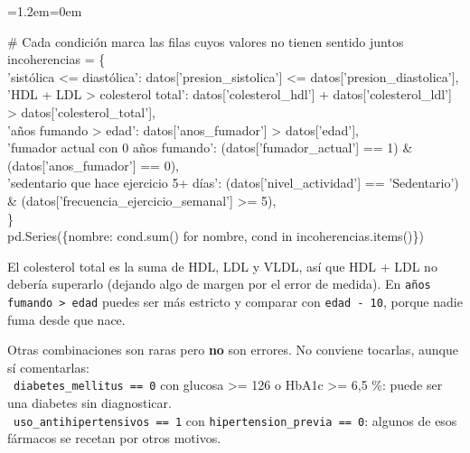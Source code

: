 \documentclass[11pt,a4paper]{article}
\newenvironment{codigo}
  {\par\smallskip\begin{list}{}{\leftmargin=1.2em\rightmargin=0em}\item\relax\ttfamily\scriptsize\raggedright}
  {\end{list}\smallskip}
\begin{document}
{\begin{codigo}
\# Cada condición marca las filas cuyos valores no tienen sentido juntos \\{}
incoherencias = \{ \\{}
\hspace*{2.08em}'sistólica \textless{}= diastólica': datos['presion\_\allowbreak{}sistolica'] \textless{}= datos['presion\_\allowbreak{}diastolica'], \\{}
\hspace*{2.08em}'HDL + LDL \textgreater{} colesterol total': datos['colesterol\_\allowbreak{}hdl'] + datos['colesterol\_\allowbreak{}ldl'] \textgreater{} datos['colesterol\_\allowbreak{}total'], \\{}
\hspace*{2.08em}'años fumando \textgreater{} edad': datos['anos\_\allowbreak{}fumador'] \textgreater{} datos['edad'], \\{}
\hspace*{2.08em}'fumador actual con 0 años fumando': (datos['fumador\_\allowbreak{}actual'] == 1) \& (datos['anos\_\allowbreak{}fumador'] == 0), \\{}
\hspace*{2.08em}'sedentario que hace ejercicio 5+ días': (datos['nivel\_\allowbreak{}actividad'] == 'Sedentario') \& (datos['frecuencia\_\allowbreak{}ejercicio\_\allowbreak{}semanal'] \textgreater{}= 5), \\{}
\} \\{}
pd.Series(\{nombre: cond.sum() for nombre, cond in incoherencias.items()\})
\end{codigo}
El colesterol total es la suma de HDL, LDL y VLDL, así que HDL + LDL no debería superarlo (dejando algo de margen por el error de medida). En \texttt{años fumando \textgreater{} edad} puedes ser más estricto y comparar con \texttt{edad - 10}, porque nadie fuma desde que nace.

Otras combinaciones son raras pero \textbf{no} son errores. No conviene tocarlas, aunque sí comentarlas: \\{}
\hspace*{1.0em}\textbullet~\texttt{diabetes\_\allowbreak{}mellitus == 0} con glucosa \textgreater{}= 126 o HbA1c \textgreater{}= 6,5 \%: puede ser una diabetes sin diagnosticar. \\{}
\hspace*{1.0em}\textbullet~\texttt{uso\_\allowbreak{}antihipertensivos == 1} con \texttt{hipertension\_\allowbreak{}previa == 0}: algunos de esos fármacos se recetan por otros motivos.

}
\end{document}
